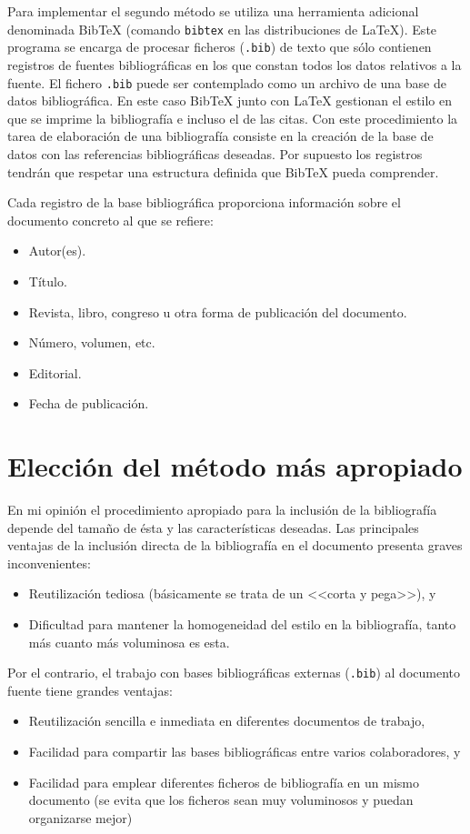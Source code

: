 \documentclass[11pt,a4paper]{article}
\begin{document}
Para implementar el segundo método se utiliza una herramienta adicional denominada Bib\TeX{} (comando \texttt{bibtex} en las distribuciones de \LaTeX). Este programa se encarga de procesar ficheros (\texttt{.bib}) de texto que sólo contienen registros de fuentes bibliográficas en los que constan todos los datos relativos a la fuente. El fichero \texttt{.bib} puede ser contemplado como un archivo de una base de datos bibliográfica. En este caso Bib\TeX{} junto con \LaTeX{} gestionan el estilo en que se imprime la bibliografía e incluso el de las citas. Con este procedimiento la tarea de elaboración de una bibliografía consiste en la creación de la base de datos con las referencias bibliográficas deseadas. Por supuesto los registros tendrán que respetar una estructura definida que Bib\TeX{} pueda comprender.

Cada registro de la base bibliográfica proporciona información sobre el documento concreto al que se refiere:
\begin{itemize}[noitemsep]
	\item Autor(es).
	\item Título.
	\item Revista, libro, congreso u otra forma de publicación del documento.
	\item Número, volumen, etc.
	\item Editorial.
	\item Fecha de publicación.
\end{itemize}



\section{Elección del método más apropiado}
En mi opinión el procedimiento apropiado para la inclusión de la bibliografía depende del tamaño de ésta y las características deseadas. Las principales ventajas de la inclusión directa de la bibliografía en el documento presenta graves inconvenientes: 
\begin{itemize}
	\item Reutilización tediosa (básicamente se trata de un <<corta y pega>>), y
	\item Dificultad para mantener la homogeneidad del estilo en la bibliografía, tanto más cuanto más voluminosa es esta.
\end{itemize}

Por el contrario, el trabajo con bases bibliográficas externas (\texttt{.bib}) al documento fuente tiene grandes ventajas:
\begin{itemize}
	\item Reutilización sencilla e inmediata en diferentes documentos de trabajo,
	\item Facilidad para compartir las bases bibliográficas entre varios colaboradores, y
	\item Facilidad para emplear diferentes ficheros de bibliografía en un mismo documento (se evita que los ficheros sean muy voluminosos y puedan organizarse mejor)
\end{itemize}
\end{document}
